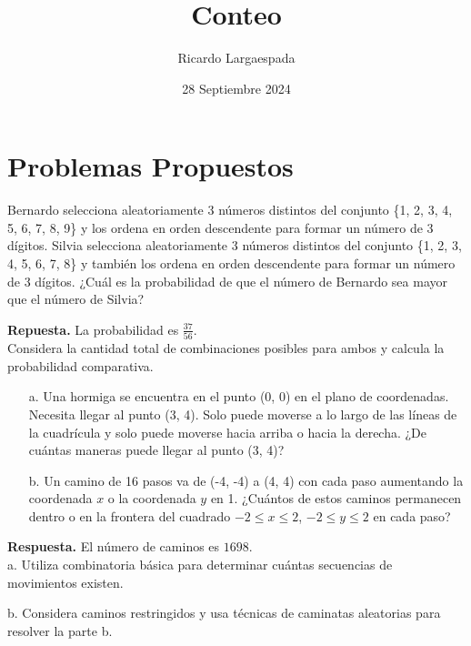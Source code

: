\documentclass[11pt]{scrartcl}
\begin{document}
\title{Conteo}
\author{Ricardo Largaespada}
\date{28 Septiembre 2024}

\maketitle

\section{Problemas Propuestos}


\begin{problem}[AMC 2010]
Bernardo selecciona aleatoriamente 3 números distintos del conjunto \{1, 2, 3, 4, 5, 6, 7, 8, 9\} y los ordena en orden descendente para formar un número de 3 dígitos. Silvia selecciona aleatoriamente 3 números distintos del conjunto \{1, 2, 3, 4, 5, 6, 7, 8\} y también los ordena en orden descendente para formar un número de 3 dígitos. ¿Cuál es la probabilidad de que el número de Bernardo sea mayor que el número de Silvia?
\begin{hint}
\textbf{Repuesta.} La probabilidad es \( \frac{37}{56} \).\\
Considera la cantidad total de combinaciones posibles para ambos y calcula la probabilidad comparativa.
\end{hint}
\end{problem}

\begin{problem}[AMC 2010]
\begin{itemize}
\item[a.] Una hormiga se encuentra en el punto (0, 0) en el plano de coordenadas. Necesita llegar al punto (3, 4). Solo puede moverse a lo largo de las líneas de la cuadrícula y solo puede moverse hacia arriba o hacia la derecha. ¿De cuántas maneras puede llegar al punto (3, 4)?

\item[b.] Un camino de 16 pasos va de (-4, -4) a (4, 4) con cada paso aumentando la coordenada \( x \) o la coordenada \( y \) en 1. ¿Cuántos de estos caminos permanecen dentro o en la frontera del cuadrado \(-2 \le x \le 2\), \(-2 \le y \le 2\) en cada paso?
\end{itemize}
\begin{hint}
\textbf{Respuesta.} El número de caminos es \( 1698 \).\\

a. Utiliza combinatoria básica para determinar cuántas secuencias de movimientos existen.

b. Considera caminos restringidos y usa técnicas de caminatas aleatorias para resolver la parte b.
\end{hint}
\end{problem}
\end{document}

